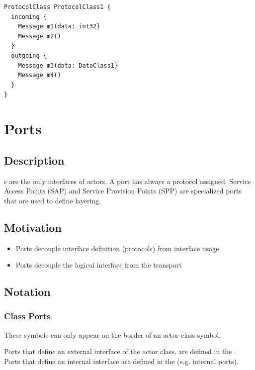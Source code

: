 \begin{lstlisting}
ProtocolClass ProtocolClass1 {
  incoming {
    Message m1(data: int32}
    Message m2()
  }
  outgoing {
    Message m3(data: DataClass1}
    Message m4()
  }
}
\end{lstlisting}

\section{Ports}

\subsection{Description}

s are the only interfaces of actors. A port has always a protocol assigned. 
Service Access Points (SAP) and Service Provision Points (SPP) are specialized ports that are used to 
define layering.

\subsection{Motivation}

\begin{itemize}
\item Ports decouple interface definition (protocols) from interface usage
\item Ports decouple the logical interface from the transport 
\end{itemize}

\subsection{Notation}

\subsubsection{Class Ports}

These symbols can only appear on the border of an actor class symbol.

Ports that define an external interface of the actor class, are defined in the . Ports 
that define an internal interface are defined in the  (e.g. internal ports).


